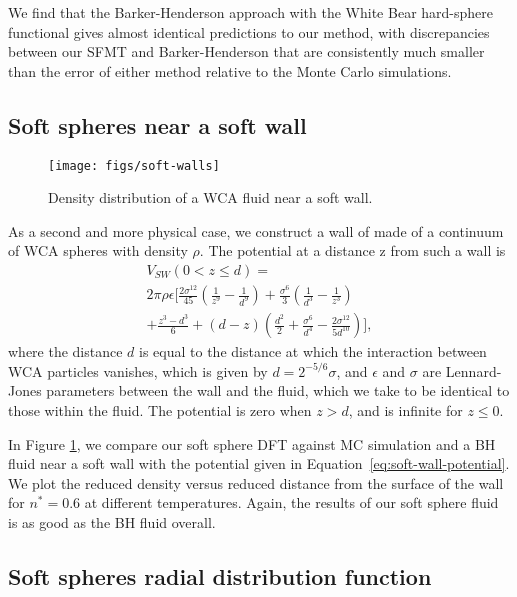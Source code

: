 \documentclass[letterpaper,twocolumn,amsmath,amssymb,prb]{revtex4-1}
\begin{document}
We find that the Barker-Henderson approach with the White Bear
hard-sphere functional gives almost identical predictions to our
method, with discrepancies between our SFMT and Barker-Henderson that
are consistently much smaller than the error of either method relative
to the Monte Carlo simulations.

\subsection{Soft spheres near a soft wall}

\begin{figure}
  \begin{center}
    \texttt{[image: figs/soft-walls]}
  \caption{Density distribution of a WCA fluid near a soft wall.}
  \label{fig:soft-walls}
  \end{center}
\end{figure}

As a second and more physical case, we construct a wall of made of a
continuum of WCA spheres with density $\rho$.  The potential
at a distance z from such a wall is
\begin{multline}
  V_{SW}(0 < z \leq d) = \\
  2\pi\rho\epsilon\Big[
  \frac{2\sigma^{12}}{45} \left(\frac{1}{z^9}-\frac{1}{d^9}\right)
  +\frac{\sigma^6}{3}\left(\frac{1}{d^3}-\frac{1}{z^3}
  \right) \\
  + \frac{z^3-d^3}{6} + \left( d - z \right)\left(\frac{d^2}{2} +
  \frac{\sigma^6}{d^4} - \frac{2\sigma^{12}}{5d^{10}}\right)
  \Bigg],
\label{eq:soft-wall-potential}
\end{multline}
where the distance $d$ is equal to the distance at which the
interaction between WCA particles vanishes, which is given by $d =
2^{-5/6}\sigma$, and $\epsilon$ and $\sigma$ are Lennard-Jones
parameters between the wall and the fluid, which we take to be
identical to those within the fluid. The potential is zero when $z>d$,
and is infinite for $z\leq 0$.

In Figure \ref{fig:soft-walls}, we compare our soft sphere DFT
against MC simulation and a BH fluid near a soft wall
with the potential given in Equation~\ref{eq:soft-wall-potential}. We
plot the reduced density versus reduced distance from the surface of
the wall for $n^*=0.6$ at different temperatures. Again, the results
of our soft sphere fluid is as good as the BH fluid
overall.

\subsection{Soft spheres radial distribution function}
\end{document}
